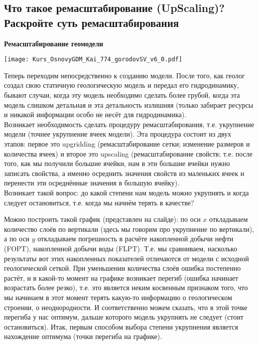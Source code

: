 

\subsection{Что такое ремасштабирование (UpScaling)? Раскройте суть ремасштабирования}

\textbf{Ремасштабирование геомодели}

\texttt{[image: Kurs\_OsnovyGDM\_Kai\_774\_gorodovSV\_v6\_0.pdf]}

Теперь переходим непосредственно к созданию модели.
После того, как геолог создал свою статичную геологическую модель и передал его гидродинамику, бывают случаи, когда эту модель необходимо сделать более грубой, когда эта модель слишком детальная и эта детальность излишняя (только забирает ресурсы и никакой информации особо не несёт для гидродинамика).
\\

Возникает необходимость сделать процедуру ремасштабирования, т.е. укрупнение модели (точнее укрупнение ячеек модели).
Эта процедура состоит из двух этапов: первое это upgridding (ремасштабирование сетки; изменение размеров и количества ячеек) и второе это upscaling (ремасштабирование свойств; т.е. после того, как мы получили большие ячейки, нам в эти большие ячейки нужно записать свойства, а именно осреднить значения свойств из маленьких ячеек и перенести эти осреднённые значения в большую ячейку).
\\

Возникает такой вопрос: до какой степени нам модель можно укрупнять и когда следует остановиться, т.е. когда мы начнём терять в качестве?

Можно построить такой график (представлен на слайде): по оси $x$ откладываем количество слоёв по вертикали (здесь мы говорим про укрупнение по вертикали), а по оси $y$ откладываем погрешность в расчёте накопленной добычи нефти (FOPT), накопленной добычи воды (FLPT).
Т.е. мы сравниваем, насколько результаты вот этих накопленных показателей отличаются от модели с исходной геологической сеткой.
При уменьшении количества слоёв ошибка постепенно растёт, и в какой-то момент на графике возникает перегиб (ошибка начинает возрастать более резко), т.е. это является неким косвенным признаком того, что мы начинаем в этот момент терять какую-то информацию о геологическом строении, о неоднородности.
И соответственно можем сказать, что в этой точке перегиба у нас оптимум, дальше которого модель укрупнять не следует (стоит остановиться).
Итак, первым способом выбора степени укрупнения является нахождение оптимума (точки перегиба на графике).

